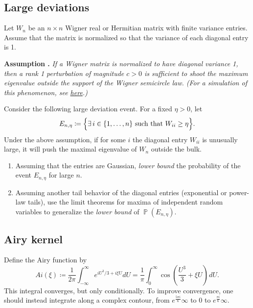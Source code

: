 \documentclass[letterpaper,11pt,oneside,reqno]{article}
\numberwithin{equation}{section}
\newcommand{\ssp}{\hspace{1pt}}
\theoremstyle{definition}
\begin{document}
\subsection{Large deviations}
\label{prob:large-deviation}

Let \(W_n\) be an \(n\times n\) Wigner real or Hermitian matrix with finite variance entries. Assume that the matrix is normalized so that the variance of each diagonal entry is 1. 

\medskip

\textbf{Assumption \cite{BBP2005phase}.} \textit{If a Wigner matrix is normalized to have diagonal variance 1, then a rank 1 perturbation of magnitude $c>0$ is sufficient to shoot the maximum eigenvalue outside the support of the Wigner semicircle law. (For a simulation of this phenomenon, see \href{https://lpetrov.cc/simulations/2025-01-28-bbp-transition/}{here}.)}

\medskip

Consider the following large deviation event. For a fixed \(\eta>0\), let
\[
E_{n,\eta}\coloneqq \Bigl\{ \exists\, i\in\{1,\dots,n\} \text{ such that } W_{ii}\ge \eta \Bigr\}.
\]
Under the above assumption, if for some \(i\) the diagonal
entry \(W_{ii}\) is unusually large, it will push the
maximal eigenvalue of \(W_n\) outside the bulk.

\begin{enumerate}
	\item Assuming that the 
		entries are Gaussian, 
		\emph{lower bound} the probability of the event \(E_{n,\eta}\) for large \(n\).
	\item
		Assuming another tail behavior of the diagonal entries (exponential or 
		power-law tails), 
		use the limit theorems for maxima of independent random variables to generalize the
		\emph{lower bound} of $\operatorname{\mathbb{P}}(E_{n,\eta})$.
\end{enumerate}

\subsection{Airy kernel}
\label{prob:airy}

Define the Airy function by 
\begin{equation*}
	Ai(\xi)\coloneqq
	\frac{1}{2\pi}\int_{-\infty}^\infty
	e^{i U^3/3+i\xi U} dU=
	\frac{1}{\pi}\int_0^\infty 
	\cos\left( \frac{U^3}{3}+\xi U \right)\ssp dU.
\end{equation*}
This integral converges, but only conditionally. To improve convergence, 
one should instead integrate 
along a complex contour,
from $e^{\frac{5 \pi i}{6}}\infty$ to $0$ to 
$e^{\frac{\pi i}{6}}\infty$.
\end{document}
